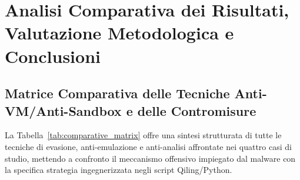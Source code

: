 \documentclass[11pt, a4paper]{article}
\begin{document}
\section{Analisi Comparativa dei Risultati, Valutazione Metodologica e Conclusioni}

\subsection{Matrice Comparativa delle Tecniche Anti-VM/Anti-Sandbox e delle Contromisure}

La Tabella~\ref{tab:comparative_matrix} offre una sintesi strutturata di tutte le tecniche di evasione, anti-emulazione e anti-analisi affrontate nei quattro casi di studio, mettendo a confronto il meccanismo offensivo impiegato dal malware con la specifica strategia ingegnerizzata negli script Qiling/Python.
\end{document}
